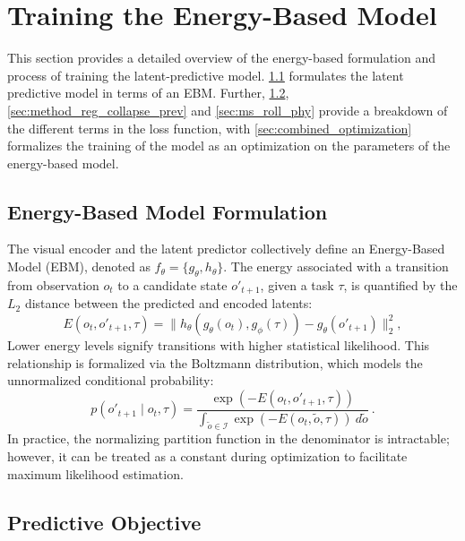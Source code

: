 \section{Training the Energy-Based Model}
\label{sec:training_ebm}

This section provides a detailed overview of the energy-based formulation and process of training the latent-predictive model. \cref{sec:method_ebm_formulation} formulates the latent predictive model in terms of an EBM. Further, \cref{sec:method_pred_obj}, \cref{sec:method_reg_collapse_prev} and \cref{sec:ms_roll_phy} provide a breakdown of the different terms in the loss function, with \cref{sec:combined_optimization} formalizes the training of the model as an optimization on the parameters of the energy-based model.

\subsection{Energy-Based Model Formulation}
\label{sec:method_ebm_formulation}

The visual encoder and the latent predictor collectively define an Energy-Based Model (EBM), denoted as $f_\theta = \{g_\theta, h_\theta\}$. The energy associated with a transition from observation \( o_t \) to a candidate state \( o'_{t+1} \), given a task \( \tau \), is quantified by the $L_2$ distance between the predicted and encoded latents:
\begin{equation}
	E(o_t, o'_{t+1}, \tau) = \| h_\theta\left(g_\theta(o_t), g_\phi(\tau)\right) - g_\theta(o'_{t+1}) \|^2_2 ,
	\label{eq:loss_energy}
\end{equation}
Lower energy levels signify transitions with higher statistical likelihood. This relationship is formalized via the Boltzmann distribution, which models the unnormalized conditional probability:
\begin{equation}
	p(o'_{t+1} \mid o_t, \tau) = \frac{\exp(-E(o_t, o'_{t+1}, \tau))}{\int_{\tilde{o} \in \mathcal{I}}{\exp(-E(o_t, \tilde{o}, \tau))\ d\tilde{o}}}\ .
	\label{eq:boltzmann}
\end{equation}
In practice, the normalizing partition function in the denominator is intractable; however, it can be treated as a constant during optimization to facilitate maximum likelihood estimation.

\subsection{Predictive Objective}
\label{sec:method_pred_obj}

